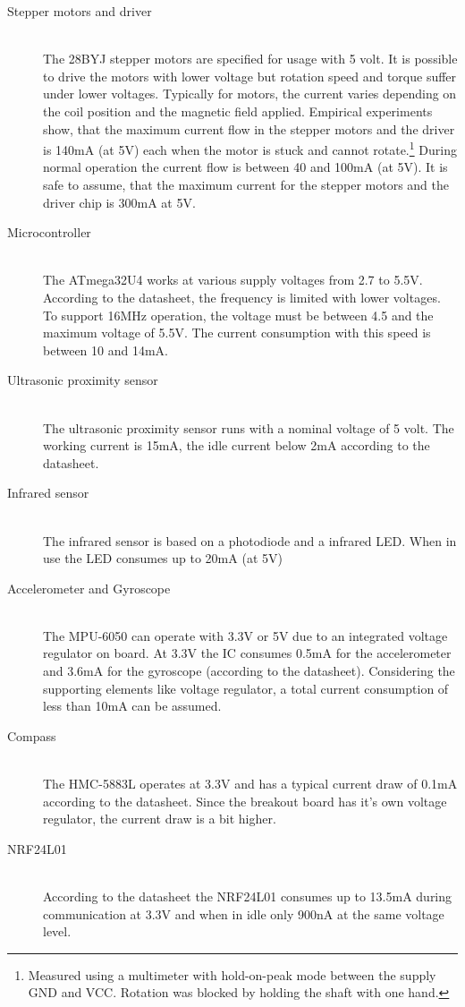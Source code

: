\begin{description}
\item[Stepper motors and driver] \hfill \\ The 28BYJ stepper motors are specified for usage with 5 volt. It is possible to drive the motors with lower voltage but rotation speed and torque suffer under lower voltages. Typically for motors, the current varies depending on the coil position and the magnetic field applied. Empirical experiments show, that the maximum current flow in the stepper motors and the driver is 140mA (at 5V) each when the motor is stuck and cannot rotate.\footnote{Measured using a multimeter with hold-on-peak mode between the supply GND and VCC. Rotation was blocked by holding the shaft with one hand.} During normal operation the current flow is between 40 and 100mA (at 5V). It is safe to assume, that the maximum current for the stepper motors and the driver chip is 300mA at 5V.
\item[Microcontroller] \hfill \\ The ATmega32U4 works at various supply voltages from 2.7 to 5.5V. According to the datasheet, the frequency is limited with lower voltages. To support 16MHz operation, the voltage must be between 4.5 and the maximum voltage of 5.5V. The current consumption with this speed is between 10 and 14mA.
\item[Ultrasonic proximity sensor] \hfill \\ The ultrasonic proximity sensor runs with a nominal voltage of 5 volt. The working current is 15mA, the idle current below 2mA according to the datasheet.
\item[Infrared sensor] \hfill \\ The infrared sensor is based on a photodiode and a infrared LED. When in use the LED consumes up to 20mA (at 5V) 
\item[Accelerometer and Gyroscope] \hfill \\ The MPU-6050 can operate with 3.3V or 5V due to an integrated voltage regulator on board. At 3.3V the IC consumes 0.5mA for the accelerometer and 3.6mA for the gyroscope (according to the datasheet). Considering the supporting elements like voltage regulator, a total current consumption of less than 10mA can be assumed.
\item[Compass] \hfill \\ The HMC-5883L operates at 3.3V and has a typical current draw of 0.1mA according to the datasheet. Since the breakout board has it's own voltage regulator, the current draw is a bit higher.
\item[NRF24L01] \hfill \\ According to the datasheet the NRF24L01 consumes up to 13.5mA during communication at 3.3V and when in idle only 900nA at the same voltage level.
\end{description}

